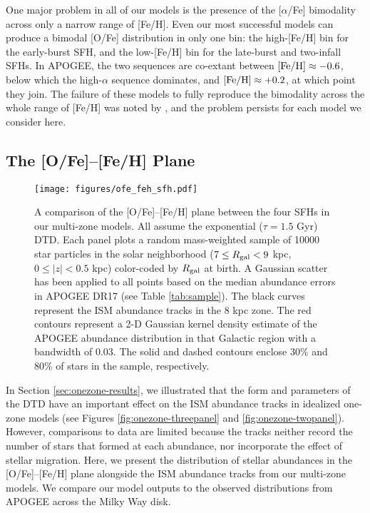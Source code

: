 \documentclass[twocolumn,twocolappendix]{aastex631}
\newcommand{\aFe}{[$\alpha$/Fe]\xspace}
\begin{document}
One major problem in all of our models is the presence of the \aFe bimodality across only a narrow range of [Fe/H]. Even our most successful models can produce a bimodal [O/Fe] distribution in only one bin: the high-[Fe/H] bin for the early-burst SFH, and the low-[Fe/H] bin for the late-burst and two-infall SFHs. In APOGEE, the two sequences are co-extant between ${\rm [Fe/H]}\approx-0.6$, below which the high-$\alpha$ sequence dominates, and ${\rm [Fe/H]}\approx+0.2$, at which point they join. The failure of these models to fully reproduce the bimodality across the whole range of [Fe/H] was noted by , and the problem persists for each model we consider here.

\subsection{The [O/Fe]--[Fe/H] Plane}
\label{sec:ofe-feh}

\begin{figure}
    \centering
    \texttt{[image: figures/ofe\_feh\_sfh.pdf]}
    \caption{A comparison of the [O/Fe]--[Fe/H] plane between the four SFHs in our multi-zone models. All assume the exponential ($\tau=1.5$ Gyr) DTD. Each panel plots a random mass-weighted sample of \num{10000} star particles in the solar neighborhood ($7\leq R_{\rm gal}<9$ kpc, $0\leq|z|<0.5$ kpc) color-coded by $R_{\rm gal}$ at birth. A Gaussian scatter has been applied to all points based on the median abundance errors in APOGEE DR17 (see Table \ref{tab:sample}). The black curves represent the ISM abundance tracks in the 8 kpc zone. The red contours represent a 2-D Gaussian kernel density estimate of the APOGEE abundance distribution in that Galactic region with a bandwidth of 0.03. The solid and dashed contours enclose 30\% and 80\% of stars in the sample, respectively.}
    \label{fig:ofe-feh-sfh}
\end{figure}

In Section \ref{sec:onezone-results}, we illustrated that the form and parameters of the DTD have an important effect on the ISM abundance tracks in idealized one-zone models (see Figures \ref{fig:onezone-threepanel} and \ref{fig:onezone-twopanel}). However, comparisons to data are limited because the tracks neither record the number of stars that formed at each abundance, nor incorporate the effect of stellar migration. Here, we present the distribution of stellar abundances in the [O/Fe]--[Fe/H] plane alongside the ISM abundance tracks from our multi-zone models. We compare our model outputs to the observed distributions from APOGEE across the Milky Way disk.
\end{document}
